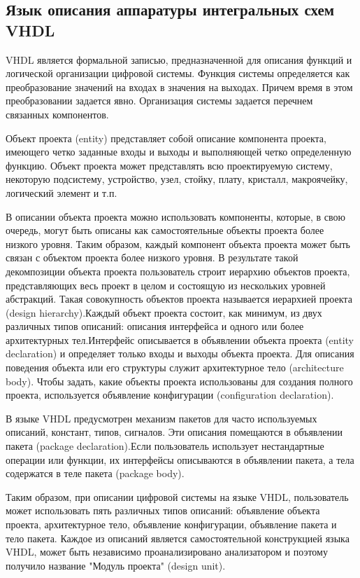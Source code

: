 \subsection{Язык описания аппаратуры интегральных схем VHDL}
\label{sub:practice:vhdl_overview}
VHDL является формальной записью, предназначенной для описания функций и логической организации цифровой системы. Функция системы определяется как преобразование значений на входах в значения на выходах. Причем время в этом преобразовании задается явно. Организация системы задается перечнем связанных компонентов.

Объект проекта (entity) представляет собой описание компонента проекта, имеющего четко заданные входы и выходы и выполняющей четко определенную функцию. Объект проекта может представлять всю проектируемую систему, некоторую подсистему, устройство, узел, стойку, плату, кристалл, макроячейку, логический элемент и т.п.

В описании объекта проекта можно использовать компоненты, которые, в свою очередь, могут быть описаны как самостоятельные объекты проекта более низкого уровня. Таким образом, каждый компонент объекта проекта может быть связан с объектом проекта более низкого уровня. В результате такой декомпозиции объекта проекта пользователь строит иерархию объектов проекта, представляющих весь проект в целом и состоящую из нескольких уровней абстракций. Такая совокупность объектов проекта называется иерархией проекта (design hierarchy).Каждый объект проекта состоит, как минимум, из двух различных типов описаний: описания интерфейса и одного или более архитектурных тел.Интерфейс описывается в объявлении объекта проекта  (entity declaration)  и определяет только входы и выходы объекта проекта. Для описания поведения объекта или его структуры служит архитектурное тело (architecture body). Чтобы задать, какие объекты проекта использованы для создания полного проекта, используется объявление конфигурации (configuration declaration).

В языке VHDL  предусмотрен механизм пакетов для часто используемых описаний, констант, типов, сигналов. Эти описания помещаются в объявлении пакета (package declaration).Если пользователь использует нестандартные операции или функции, их интерфейсы описываются в объявлении пакета, а тела содержатся в теле пакета (package body).

Таким образом, при описании цифровой системы на языке VHDL,  пользователь может использовать пять различных типов описаний: объявление объекта проекта, архитектурное тело, объявление конфигурации, объявление пакета и тело пакета. Каждое из описаний является самостоятельной конструкцией языка  VHDL, может быть независимо проанализировано анализатором и поэтому получило название "Модуль проекта" (design unit).

